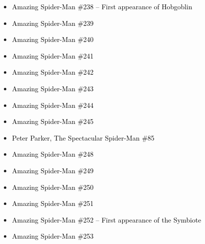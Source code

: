 \documentclass[12pt]{article}
\newcommand{\checkbox}{\raisebox{0.0ex}{\fbox{\rule{0ex}{1.5ex} \rule{1.5ex}{0ex}}}}
\begin{document}
\begin{center}
\begin{tcolorbox}[colback=white!95!gray, colframe=black, width=0.9\textwidth, arc=4mm, auto outer arc, boxrule=0.8pt]
\begin{itemize}[left=0pt,label={\checkbox}]
    \item \textcolor{black}{Amazing Spider-Man \#238 – First appearance of Hobgoblin}
    \item \textcolor{black}{Amazing Spider-Man \#239}
    \item \textcolor{black}{Amazing Spider-Man \#240}
    \item \textcolor{black}{Amazing Spider-Man \#241}
    \item \textcolor{black}{Amazing Spider-Man \#242}
    \item \textcolor{black}{Amazing Spider-Man \#243}
    \item \textcolor{black}{Amazing Spider-Man \#244}
    \item \textcolor{black}{Amazing Spider-Man \#245}
    \item \textcolor{black}{Peter Parker, The Spectacular Spider-Man \#85}
    \item \textcolor{black}{Amazing Spider-Man \#248}
    \item \textcolor{black}{Amazing Spider-Man \#249}
    \item \textcolor{black}{Amazing Spider-Man \#250}
    \item \textcolor{black}{Amazing Spider-Man \#251}
    \item \textcolor{black}{Amazing Spider-Man \#252 – First appearance of the Symbiote}
    \item \textcolor{black}{Amazing Spider-Man \#253}
\end{itemize}
\end{tcolorbox}
\end{center}
\end{document}
